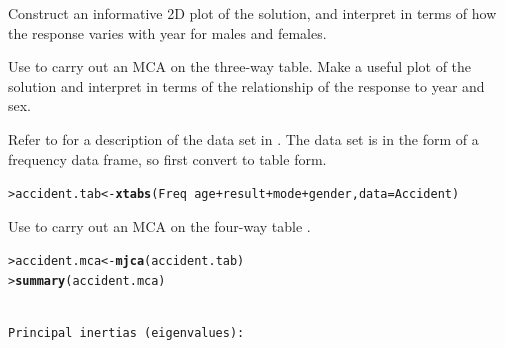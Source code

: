 \documentclass[10pt]{report}\usepackage[]{graphicx}\usepackage[]{color}
\makeatletter
\newcommand{\hlopt}[1]{\textcolor[rgb]{0,0,0}{#1}}%
\newcommand{\hlstd}[1]{\textcolor[rgb]{0.345,0.345,0.345}{#1}}%
\newcommand{\hlkwb}[1]{\textcolor[rgb]{0.69,0.353,0.396}{#1}}%
\newcommand{\hlkwc}[1]{\textcolor[rgb]{0.333,0.667,0.333}{#1}}%
\newcommand{\hlkwd}[1]{\textcolor[rgb]{0.737,0.353,0.396}{\textbf{#1}}}%
\newenvironment{kframe}{%
 \def\at@end@of@kframe{}%
 \ifinner\ifhmode%
  \def\at@end@of@kframe{\end{minipage}}%
  \begin{minipage}{\columnwidth}%
 \fi\fi%
 \def\FrameCommand##1{\hskip\@totalleftmargin \hskip-\fboxsep
 \colorbox{shadecolor}{##1}\hskip-\fboxsep
     \hskip-\linewidth \hskip-\@totalleftmargin \hskip\columnwidth}%
 \MakeFramed {\advance\hsize-\width
   \@totalleftmargin\z@ \linewidth\hsize
   \@setminipage}}%
 {\par\unskip\endMakeFramed%
 \at@end@of@kframe}
\newenvironment{knitrout}{}{} %
\renewenvironment{knitrout}{\small\renewcommand{\baselinestretch}{.85}}{} %
\makeatother
\begin{document}
\begin{Exercises}
\begin{enumerate*}
    \item Construct an informative 2D plot of the solution, and interpret in terms of how the response varies with year for
    males and females.
    \begin{ans}
    \end{ans}
    
    \item Use  to carry out an MCA on the three-way table.  Make a useful plot of the solution and interpret
    in terms of the relationship of the response to year and sex.
    \begin{ans}
    \end{ans}
    
  \end{enumerate*}

\exercise\label{lab:ca-accident} Refer to  for a description of the  data set
  in . The data set is in the form of a frequency data frame, so first convert to table form.
\begin{knitrout}\footnotesize
{}\color{fgcolor}\begin{kframe}
\begin{alltt}
\hlstd{> }\hlstd{accident.tab} \hlkwb{<-} \hlkwd{xtabs}\hlstd{(Freq} \hlopt{~} \hlstd{age} \hlopt{+} \hlstd{result} \hlopt{+} \hlstd{mode} \hlopt{+} \hlstd{gender,} \hlkwc{data}\hlstd{=Accident)}
\end{alltt}
\end{kframe}
\end{knitrout}

  \begin{enumerate*}
    \item Use  to carry out an MCA on the four-way table .
    \begin{ans}
\begin{knitrout}\footnotesize
{}\color{fgcolor}\begin{kframe}
\begin{alltt}
\hlstd{> }\hlstd{accident.mca} \hlkwb{<-} \hlkwd{mjca}\hlstd{(accident.tab)}
\hlstd{> }\hlkwd{summary}\hlstd{(accident.mca)}
\end{alltt}
\begin{verbatim}

Principal inertias (eigenvalues):


\end{verbatim}
\end{kframe}
\end{knitrout}
\end{ans}
\end{enumerate*}
\end{Exercises}
\end{document}
